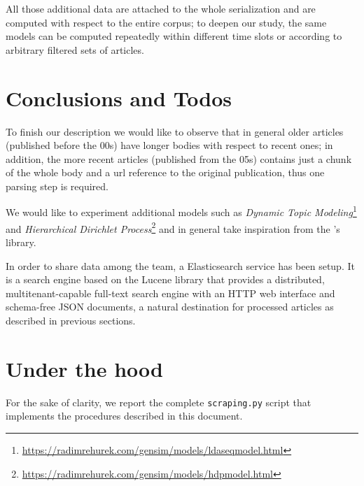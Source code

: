 \documentclass[a4paper]{article}
\begin{document}
All those additional data are attached to the whole serialization and are
computed with respect to the entire corpus; to deepen our study, the same
models can be computed repeatedly within different time slots or according to
arbitrary filtered sets of articles.

\section{Conclusions and Todos}

To finish our description we would like to observe that in general older
articles (published before the 00s) have longer bodies with respect to recent
ones; in addition, the more recent articles (published from the 05s) contains
just a chunk of the whole body and a url reference to the original publication,
thus one parsing step is required.

We would like to experiment additional models such as \emph{Dynamic Topic
Modeling}\footnote{\url{https://radimrehurek.com/gensim/models/ldaseqmodel.html}}
and \emph{Hierarchical Dirichlet
Process}\footnote{\url{https://radimrehurek.com/gensim/models/hdpmodel.html}}
and in general take inspiration from the \citet{rehurek_lrec}'s library.

In order to share data among the team, a Elasticsearch service has been setup.
It is a search engine based on the Lucene library that provides a distributed,
multitenant-capable full-text search engine with an HTTP web interface and
schema-free JSON documents, a natural destination for processed articles as
described in previous sections. 





\newpage

\section*{Under the hood}
\label{sec:uth}

For the sake of clarity, we report the complete \verb|scraping.py| script that
implements the procedures described in this document.

\end{document}
